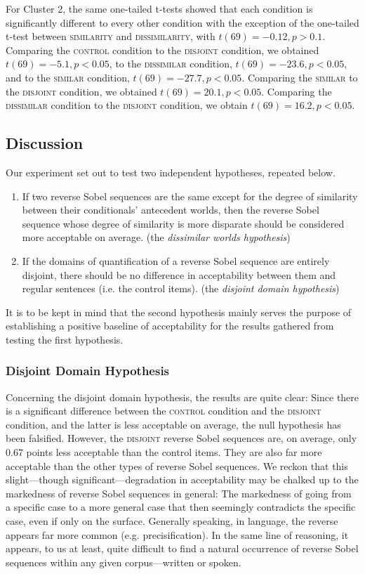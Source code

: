 For Cluster 2, the same one-tailed t-tests showed that each condition is significantly different to every other condition with the exception of the one-tailed t-test between {\scshape similarity} and {\scshape dissimilarity}, with $t(69)=-0.12, p>0.1$. Comparing the {\scshape control} condition to the {\scshape disjoint} condition, we obtained $t(69)=-5.1, p<0.05$, to the {\scshape dissimilar} condition, $t(69)=-23.6, p<0.05$, and to the {\scshape similar} condition, $t(69)=-27.7, p<0.05$. Comparing the {\scshape similar} to the {\scshape disjoint} condition, we obtained $t(69)=20.1, p<0.05$. Comparing the {\scshape dissimilar} condition to the {\scshape disjoint} condition, we obtain $t(69)=16.2, p<0.05$.


\subsection{Discussion}
Our experiment set out to test two independent hypotheses, repeated below.
\begin{enumerate}
    \item If two reverse Sobel sequences are the same except for the degree of similarity between their conditionals' antecedent worlds, then the reverse Sobel sequence whose degree of similarity is more disparate should be considered more acceptable on average. (the \textit{dissimilar worlds hypothesis})
    \item If the domains of quantification of a reverse Sobel sequence are entirely disjoint, there should be no difference in acceptability between them and regular sentences (i.e. the control items). (the \textit{disjoint domain hypothesis})
\end{enumerate}
It is to be kept in mind that the second hypothesis mainly serves the purpose of establishing a positive baseline of acceptability for the results gathered from testing the first hypothesis.

\subsubsection{Disjoint Domain Hypothesis}
Concerning the disjoint domain hypothesis, the results are quite clear: Since there is a significant difference between the {\scshape control} condition and the {\scshape disjoint} condition, and the latter is less acceptable on average, the null hypothesis has been falsified. However, the {\scshape disjoint} reverse Sobel sequences are, on average, only 0.67 points less acceptable than the control items. They are also far more acceptable than the other types of reverse Sobel sequences. We reckon that this slight---though significant---degradation in acceptability may be chalked up to the markedness of reverse Sobel sequences in general: The markedness of going from a specific case to a more general case that then seemingly contradicts the specific case, even if only on the surface. Generally speaking, in language, the reverse appears far more common (e.g. precisification). In the same line of reasoning, it appears, to us at least, quite difficult to find a natural occurrence of reverse Sobel sequences within any given corpus---written or spoken.

